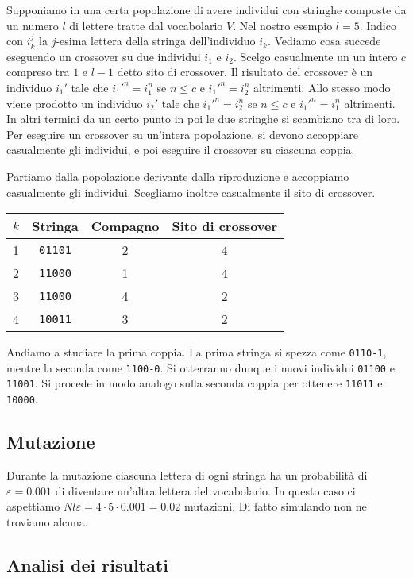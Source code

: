 \documentclass[a4paper, 11pt]{article}
\newcommand{\code}{\texttt}
\begin{document}
Supponiamo in una certa popolazione di avere individui con stringhe composte da
un numero $l$ di lettere tratte dal vocabolario $V$. Nel nostro esempio $l=5$.
Indico con $i_k^j$ la $j$-esima lettera della stringa dell'individuo $i_k$.
Vediamo cosa succede eseguendo un crossover su due individui $i_1$ e $i_2$.
Scelgo casualmente un un intero $c$ compreso tra $1$ e $l-1$ detto sito di
crossover. Il risultato del crossover è un individuo $i_1'$ tale che
$i_1'^n=i_1^n$ se $n\leq c$ e $i_1'^n=i_2^n$ altrimenti. Allo stesso modo viene
prodotto un individuo $i_2'$ tale che $i_1'^n=i_2^n$ se $n\leq c$ e
$i_1'^n=i_1^n$ altrimenti. In altri termini da un certo punto in poi le due
stringhe si scambiano tra di loro. Per eseguire un crossover su un'intera
popolazione, si devono accoppiare casualmente gli individui, e poi eseguire il
crossover su ciascuna coppia. 

Partiamo dalla popolazione derivante dalla riproduzione e accoppiamo casualmente
gli individui. Scegliamo inoltre casualmente il sito di crossover.
\begin{table}[h!]
\begin{tabular}{l|ccc}
$k$ & Stringa & Compagno & Sito di crossover \\ \hline
1 & \code{01101} & 2 & 4 \\
2 & \code{11000} & 1 & 4 \\
3 & \code{11000} & 4 & 2 \\
4 & \code{10011} & 3 & 2
\end{tabular}
\end{table}

Andiamo a studiare la prima coppia. La prima stringa si spezza come
\code{0110-1}, mentre la seconda come \code{1100-0}. Si otterranno dunque i
nuovi individui \code{01100} e \code{11001}. Si procede in modo analogo sulla
seconda coppia per ottenere \code{11011} e \code{10000}.



\subsection{Mutazione}

Durante la mutazione ciascuna lettera di ogni stringa ha un probabilità di
$\varepsilon=0.001$ di diventare un'altra lettera del vocabolario. In questo
caso ci aspettiamo $Nl \varepsilon=4\cdot 5 \cdot 0.001= 0.02$ mutazioni. Di
fatto simulando non ne troviamo alcuna. 



\subsection{Analisi dei risultati}
\end{document}

